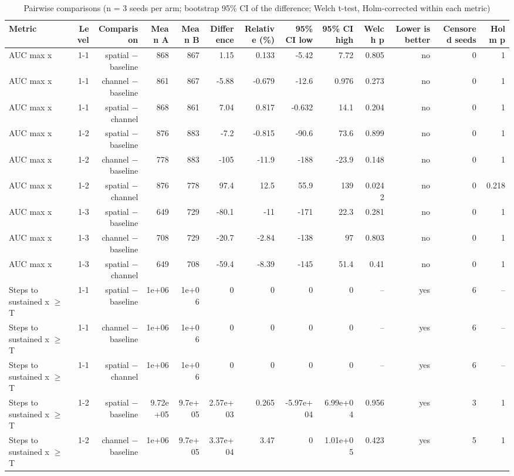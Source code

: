 \begin{table}[t]
\centering
\caption{Pairwise comparisons (n = 3 seeds per arm; bootstrap 95\% CI of the difference; Welch t-test, Holm-corrected within each metric)}
\label{tab:ablation_statistics}
\begin{tabular}{lrrrrrrrrrrrr}
\toprule
Metric & Level & Comparison & Mean A & Mean B & Difference & Relative (\%) & 95\% CI low & 95\% CI high & Welch p & Lower is better & Censored seeds & Holm p \\
\midrule
AUC max x & 1-1 & spatial $-$ baseline & 868 & 867 & 1.15 & 0.133 & -5.42 & 7.72 & 0.805 & no & 0 & 1 \\
AUC max x & 1-1 & channel $-$ baseline & 861 & 867 & -5.88 & -0.679 & -12.6 & 0.976 & 0.273 & no & 0 & 1 \\
AUC max x & 1-1 & spatial $-$ channel & 868 & 861 & 7.04 & 0.817 & -0.632 & 14.1 & 0.204 & no & 0 & 1 \\
AUC max x & 1-2 & spatial $-$ baseline & 876 & 883 & -7.2 & -0.815 & -90.6 & 73.6 & 0.899 & no & 0 & 1 \\
AUC max x & 1-2 & channel $-$ baseline & 778 & 883 & -105 & -11.9 & -188 & -23.9 & 0.148 & no & 0 & 1 \\
AUC max x & 1-2 & spatial $-$ channel & 876 & 778 & 97.4 & 12.5 & 55.9 & 139 & 0.0242 & no & 0 & 0.218 \\
AUC max x & 1-3 & spatial $-$ baseline & 649 & 729 & -80.1 & -11 & -171 & 22.3 & 0.281 & no & 0 & 1 \\
AUC max x & 1-3 & channel $-$ baseline & 708 & 729 & -20.7 & -2.84 & -138 & 97 & 0.803 & no & 0 & 1 \\
AUC max x & 1-3 & spatial $-$ channel & 649 & 708 & -59.4 & -8.39 & -145 & 51.4 & 0.41 & no & 0 & 1 \\
Steps to sustained x $\geq$ T & 1-1 & spatial $-$ baseline & 1e+06 & 1e+06 & 0 & 0 & 0 & 0 & – & yes & 6 & – \\
Steps to sustained x $\geq$ T & 1-1 & channel $-$ baseline & 1e+06 & 1e+06 & 0 & 0 & 0 & 0 & – & yes & 6 & – \\
Steps to sustained x $\geq$ T & 1-1 & spatial $-$ channel & 1e+06 & 1e+06 & 0 & 0 & 0 & 0 & – & yes & 6 & – \\
Steps to sustained x $\geq$ T & 1-2 & spatial $-$ baseline & 9.72e+05 & 9.7e+05 & 2.57e+03 & 0.265 & -5.97e+04 & 6.99e+04 & 0.956 & yes & 3 & 1 \\
Steps to sustained x $\geq$ T & 1-2 & channel $-$ baseline & 1e+06 & 9.7e+05 & 3.37e+04 & 3.47 & 0 & 1.01e+05 & 0.423 & yes & 5 & 1 \\

\end{tabular}
\end{table}
